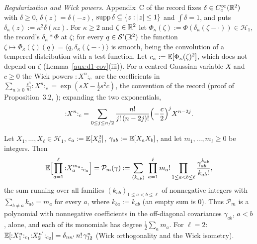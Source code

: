 \emph{Regularization and Wick powers.} Appendix~C of the record \cite[p.~39]{R} fixes
$\delta\in C_c^\infty(\mathbb{R}^2)$ with $\delta\ge0$, $\delta(z)=\delta(-z)$,
$\operatorname{supp}\delta\subseteq\{z:|z|\le1\}$ and $\int\delta=1$, and puts
$\delta_\kappa(z):=\kappa^2\delta(\kappa z)$. For $\kappa\ge2$ and $\zeta\in\mathbb{R}^2$ let
$\Phi_\kappa(\zeta):=\Phi(\delta_\kappa(\zeta-\cdot))\in\mathscr H_1$, the record's
$\delta_\kappa*\Phi$ at $\zeta$; for every $q\in\mathcal S'(\mathbb{R}^2)$ the function
$\zeta\mapsto\Phi_\kappa(\zeta)(q)=\langle q,\delta_\kappa(\zeta-\cdot)\rangle$ is smooth, being
the convolution of a tempered distribution with a test function. Let
$c_\kappa:=\mathbb{E}[\Phi_\kappa(\zeta)^2]$, which does not depend on $\zeta$
(Lemma~\ref{aux:d1-cov}(iii)). For a centred Gaussian variable $X$ and $c\ge0$ the Wick powers
${:}X^n{:}_c$ are the coefficients in
$\sum_{n\ge0}\frac{s^n}{n!}{:}X^n{:}_c=\exp(sX-\frac12s^2c)$, the convention of the record
(proof of Proposition~3.2, \cite[p.~16]{R}); expanding the two exponentials,
\begin{equation}\label{eq:d1-hermite}
 {:}X^n{:}_c=\sum_{0\le j\le n/2}\frac{n!}{j!\,(n-2j)!}\Bigl(-\frac c2\Bigr)^jX^{n-2j} .
\end{equation}

\begin{auxlemma}\label{aux:d1-wick}
Let $X_1,\dots,X_\ell\in\mathscr H_1$, $c_a:=\mathbb{E}[X_a^2]$, $\gamma_{ab}:=\mathbb{E}[X_aX_b]$, and let
$m_1,\dots,m_\ell\ge0$ be integers. Then
\begin{equation}\label{eq:d1-wick}
 \mathbb{E}\Bigl[\prod_{a=1}^\ell{:}X_a^{m_a}{:}_{c_a}\Bigr]=\mathcal P_m(\gamma)
 :=\sum_{(k_{ab})}\ \prod_{a=1}^\ell m_a!\prod_{1\le a<b\le\ell}
 \frac{\gamma_{ab}^{k_{ab}}}{k_{ab}!} ,
\end{equation}
the sum running over all families $(k_{ab})_{1\le a<b\le\ell}$ of nonnegative integers with
$\sum_{b\ne a}k_{ab}=m_a$ for every $a$, where $k_{ba}:=k_{ab}$ (an empty sum is $0$). Thus
$\mathcal P_m$ is a polynomial with nonnegative coefficients in the off-diagonal covariances
$\gamma_{ab}$, $a<b$, alone, and each of its monomials has degree $\frac12\sum_am_a$. For
$\ell=2$: $\mathbb{E}[{:}X_1^n{:}_{c_1}{:}X_2^{n'}{:}_{c_2}]=\delta_{nn'}\,n!\,\gamma_{12}^n$ (Wick
orthogonality and the Wick isometry).
\end{auxlemma}

